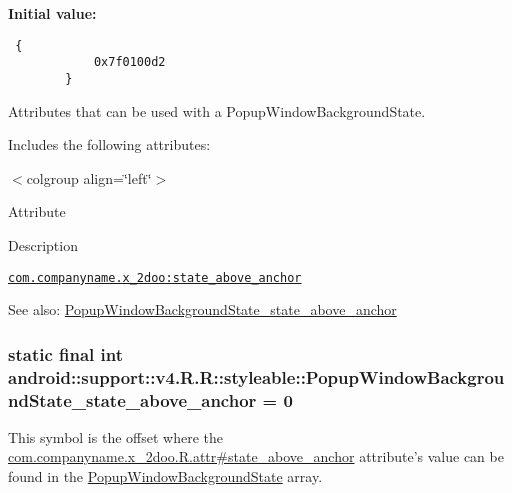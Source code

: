 \textbf{Initial value:}

\begin{Code}\begin{verbatim} {
            0x7f0100d2
        }
\end{verbatim}
\end{Code}
Attributes that can be used with a PopupWindowBackgroundState. 

Includes the following attributes: \begin{TabularC}{0}
\hline
\end{TabularC}
$<$colgroup align=\char`\"{}left\char`\"{}$>$ 

Attribute

Description 

{\tt \hyperlink{classandroid_1_1support_1_1v4_1_1_r_1_1styleable_79a9881bda014af06ecb1d745e81265d}{com.companyname.x\_\-2doo:state\_\-above\_\-anchor}}

\begin{Desc}
\item[See also:]\hyperlink{classandroid_1_1support_1_1v4_1_1_r_1_1styleable_79a9881bda014af06ecb1d745e81265d}{PopupWindowBackgroundState\_\-state\_\-above\_\-anchor} \end{Desc}
\hypertarget{classandroid_1_1support_1_1v4_1_1_r_1_1styleable_79a9881bda014af06ecb1d745e81265d}{
\subsubsection[{PopupWindowBackgroundState\_\-state\_\-above\_\-anchor}]{\setlength{\rightskip}{0pt plus 5cm}static final int android::support::v4.R.R::styleable::PopupWindowBackgroundState\_\-state\_\-above\_\-anchor = 0}}
\label{classandroid_1_1support_1_1v4_1_1_r_1_1styleable_79a9881bda014af06ecb1d745e81265d}


This symbol is the offset where the \hyperlink{classcom_1_1companyname_1_1x__2doo_1_1_r_1_1attr_217abc47da25760c491c7a95e32a9cf7}{com.companyname.x\_\-2doo.R.attr\#state\_\-above\_\-anchor} attribute's value can be found in the \hyperlink{classandroid_1_1support_1_1v4_1_1_r_1_1styleable_56d74cecf54da79f987d78d92156efde}{PopupWindowBackgroundState} array.

